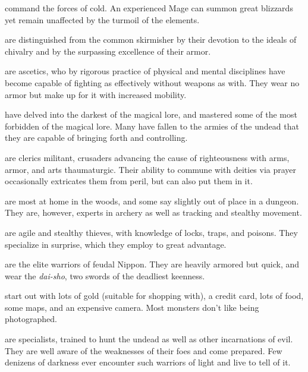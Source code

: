 \item[\bb{Ice Mages}]%
command the forces of cold.  An experienced Mage can
summon great blizzards yet remain unaffected by the turmoil of the elements.

\item[\bb{Knights}]%
are distinguished from the common skirmisher by their
devotion to the ideals of chivalry and by the surpassing excellence of
their armor.

\item[\bb{Monks}]%
are ascetics, who by rigorous practice of physical and mental
disciplines have become capable of fighting as effectively without weapons
as with.  They wear no armor but make up for it with increased mobility.

\item[\bb{Necromancers}]%
have delved into the darkest of the magical lore, and
mastered some of the most forbidden of the magical lore.  Many have fallen
to the armies of the undead that they are capable of bringing forth and
controlling.

\item[\bb{Priests {\rm and }Priestesses}]%
are clerics militant, crusaders
advancing the cause of righteousness with arms, armor, and arts
thaumaturgic.  Their ability to commune with deities via prayer
occasionally extricates them from peril, but can also put them in it.

\item[\bb{Rangers}]%
are most at home in the woods, and some say slightly out
of place in a dungeon.  They are, however, experts in archery as well
as tracking and stealthy movement.

\item[\bb{Rogues}]%
are agile and stealthy thieves, with knowledge of locks,
traps, and poisons.  They specialize in surprise, which they employ
to great advantage.

\item[\bb{Samurai}]%
are the elite warriors of feudal Nippon.  They are heavily
armored but quick, and wear the {\it dai-sho}, two swords of the deadliest
keenness.

\item[\bb{Tourists}]%
start out with lots of gold (suitable for shopping with),
a credit card, lots of food, some maps, and an expensive camera.  Most
monsters don't like being photographed.

\item[\bb{Undead Slayers}]%
are specialists,  trained to hunt the undead as well
as other incarnations of evil.  They are well aware of the weaknesses of
their foes and come prepared.  Few denizens of darkness ever encounter such
warriors of light and live to tell of it.

